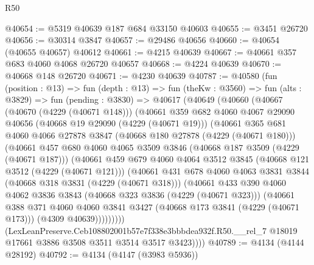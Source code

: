\begin{lexlean}{R50}
\begin{coremodule}
@40654 := @5319 @40639 @187 @684 @33150 @40603
@40655 := @3451 @26720
@40656 := @30314 @3847
@40657 := @29486 @40656
@40660 := @40654 (@40655 @40657) @40612
@40661 := @4215 @40639
@40667 := @40661 @357 @683 @4060 @4068 @26720 @40657
@40668 := @4224 @40639
@40670 := @40668 @148 @26720
@40671 := @4230 @40639
@40787 := @40580
    (fun (position : @13) =>
    fun (depth : @13) =>
    fun (theKw : @3560) =>
    fun (alts : @3829) =>
    fun (pending : @3830) =>
    @40617
      (@40649
        (@40660
          (@40667
            (@40670 (@4229 (@40671 @148)))
            (@40661
              @359
              @682
              @4060
              @4067
              @29090
              @40656
              (@40668 @19 @29090 (@4229 (@40671 @19)))
              (@40661
                @365
                @681
                @4060
                @4066
                @27878
                @3847
                (@40668 @180 @27878 (@4229 (@40671 @180)))
                (@40661
                  @457
                  @680
                  @4060
                  @4065
                  @3509
                  @3846
                  (@40668 @187 @3509 (@4229 (@40671 @187)))
                  (@40661
                    @459
                    @679
                    @4060
                    @4064
                    @3512
                    @3845
                    (@40668 @121 @3512 (@4229 (@40671 @121)))
                    (@40661
                      @431
                      @678
                      @4060
                      @4063
                      @3831
                      @3844
                      (@40668 @318 @3831 (@4229 (@40671 @318)))
                      (@40661
                        @433
                        @390
                        @4060
                        @4062
                        @3836
                        @3843
                        (@40668 @323 @3836 (@4229 (@40671 @323)))
                        (@40661
                          @388
                          @371
                          @4060
                          @4060
                          @3841
                          @3427
                          (@40668 @173 @3841 (@4229 (@40671 @173)))
                          (@4309 @40639)))))))))
          (LexLeanPreserve.Ceb108802001b57e7f338e3bbbdea932f.R50.__rel_7
            @18019
            @17661
            @3886
            @3508
            @3511
            @3514
            @3517
            @3423))))
@40789 := @4134 (@4144 @28192)
@40792 := @4134 (@4147 (@3983 @5936))

\end{coremodule}
\end{lexlean}
